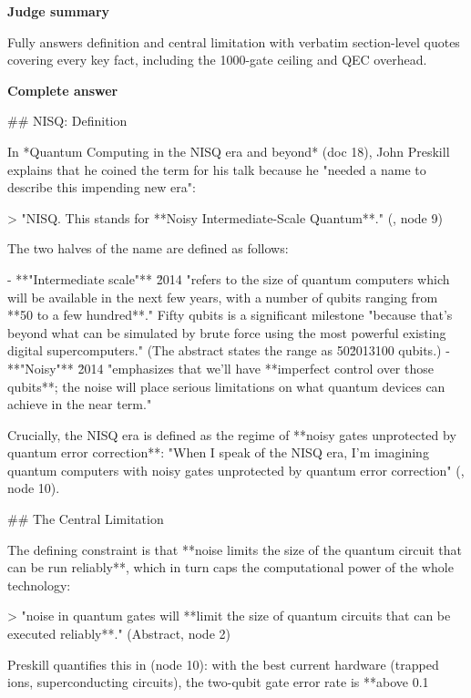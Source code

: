 \documentclass[10pt]{article}
\begin{document}
\textbf{Judge summary}
\begin{EvidenceText}
Fully answers definition and central limitation with verbatim section-level quotes covering every key fact, including the 1000-gate ceiling and QEC overhead.
\end{EvidenceText}

\textbf{Complete answer}
\begin{AnswerText}
## NISQ: Definition

In *Quantum Computing in the NISQ era and beyond* (doc 18), John Preskill explains that he coined the term for his talk because he "needed a name to describe this impending new era":

> "NISQ. This stands for **Noisy Intermediate-Scale Quantum**." (, node 9)

The two halves of the name are defined as follows:

- **"Intermediate scale"** \u2014 "refers to the size of quantum computers which will be available in the next few years, with a number of qubits ranging from **50 to a few hundred**." Fifty qubits is a significant milestone "because that's beyond what can be simulated by brute force using the most powerful existing digital supercomputers." (The abstract states the range as 50\u2013100 qubits.)
- **"Noisy"** \u2014 "emphasizes that we'll have **imperfect control over those qubits**; the noise will place serious limitations on what quantum devices can achieve in the near term."

Crucially, the NISQ era is defined as the regime of **noisy gates unprotected by quantum error correction**: "When I speak of the NISQ era, I'm imagining quantum computers with noisy gates unprotected by quantum error correction" (, node 10).

## The Central Limitation

The defining constraint is that **noise limits the size of the quantum circuit that can be run reliably**, which in turn caps the computational power of the whole technology:

> "noise in quantum gates will **limit the size of quantum circuits that can be executed reliably**." (Abstract, node 2)

Preskill quantifies this in  (node 10): with the best current hardware (trapped ions, superconducting circuits), the two-qubit gate error rate is **above 0.1%


\end{AnswerText}
\end{document}

